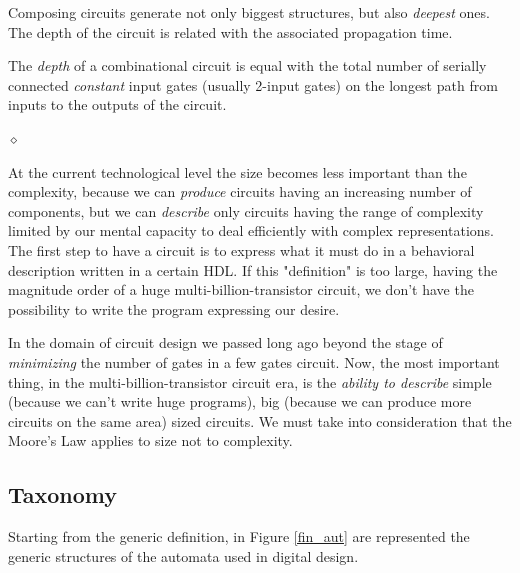 Composing circuits generate not only biggest structures, but also
{\em deepest} ones. The depth of the circuit is related with the
associated propagation time.

\begin{definition}
The {\em depth} of a combinational circuit is equal with the total
number of serially connected {\em constant} input gates (usually 2-input gates) on the longest path from inputs
to the outputs of the circuit.

$\diamond$
\end{definition}



At the current technological level the size becomes  less
important than the complexity, because we can {\em produce}
circuits having an increasing number of components, but we can
{\em describe} only circuits having the range of complexity
limited by our mental capacity to deal efficiently with complex
representations. The first step to have a circuit is to express
what it must do in a behavioral description written in a certain
HDL. If this "definition" is too large, having the magnitude order
of a huge multi-billion-transistor circuit, we don't have the
possibility to write the program expressing our desire.

In the domain of circuit design we passed long ago beyond the
stage of {\em minimizing} the number of gates in a few gates
circuit. Now, the most important thing, in the
multi-billion-transistor circuit era, is the {\em ability to
describe} simple (because we can't
write huge programs), big (because we can produce more circuits on
the same area) sized circuits. We must take into consideration that the Moore's Law applies to size not
to complexity.




\subsection{Taxonomy}

Starting from the generic definition, in Figure \ref{fin_aut} are represented the generic structures of the automata used in digital design.

